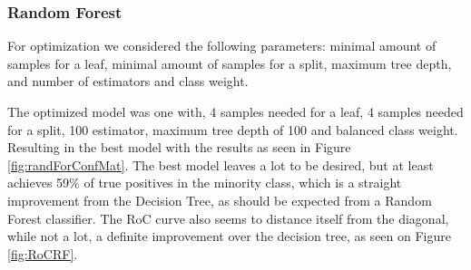 \documentclass[11pt, a4paper]{article}
\begin{document}
\subsubsection{Random Forest}

For optimization we considered the following parameters: minimal amount of samples for a leaf, minimal amount of samples for a split, maximum tree depth, and number of estimators and class weight.

The optimized model was one with, 4 samples needed for a leaf, 4 samples needed for a split, 100 estimator, maximum tree depth of 100 and balanced class weight. Resulting in the best model with the results as seen in Figure \ref{fig:randForConfMat}.  The best model leaves a lot to be desired, but at least achieves 59\% of true positives in the minority class, which is a straight improvement from the Decision Tree, as should be expected from a Random Forest classifier. The RoC curve also seems to distance itself from the diagonal, while not a lot, a definite improvement over the decision tree, as seen on Figure \ref{fig:RoCRF}.


\end{document}
